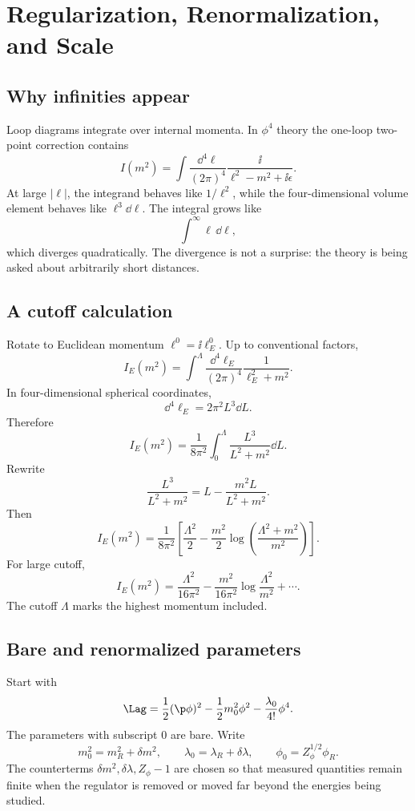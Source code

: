 \chapter{Regularization, Renormalization, and Scale}

\section{Why infinities appear}

Loop diagrams integrate over internal momenta.  In \(\phi^4\) theory the one-loop two-point correction contains
\[
  I(m^2)=\int\frac{\dd^4\ell}{(2\pi)^4}
  \frac{\ii}{\ell^2-m^2+\ii\epsilon}.
\]
At large \(|\ell|\), the integrand behaves like \(1/\ell^2\), while the four-dimensional volume element behaves like \(\ell^3\dd\ell\).  The integral grows like
\[
  \int^\infty \ell\,\dd\ell,
\]
which diverges quadratically.  The divergence is not a surprise: the theory is being asked about arbitrarily short distances.

\section{A cutoff calculation}

Rotate to Euclidean momentum \(\ell^0=\ii\ell_E^0\).  Up to conventional factors,
\[
  I_E(m^2)=\int^{\Lambda}\frac{\dd^4\ell_E}{(2\pi)^4}
  \frac{1}{\ell_E^2+m^2}.
\]
In four-dimensional spherical coordinates,
\[
  \dd^4\ell_E=2\pi^2 L^3\dd L.
\]
Therefore
\[
  I_E(m^2)
  =
  \frac{1}{8\pi^2}
  \int_0^\Lambda\frac{L^3}{L^2+m^2}\dd L.
\]
Rewrite
\[
  \frac{L^3}{L^2+m^2}=L-\frac{m^2L}{L^2+m^2}.
\]
Then
\[
  I_E(m^2)
  =
  \frac{1}{8\pi^2}
  \left[
  \frac{\Lambda^2}{2}
  -
  \frac{m^2}{2}\log\left(\frac{\Lambda^2+m^2}{m^2}\right)
  \right].
\]
For large cutoff,
\[
  I_E(m^2)
  =
  \frac{\Lambda^2}{16\pi^2}
  -
  \frac{m^2}{16\pi^2}\log\frac{\Lambda^2}{m^2}
  +\cdots .
\]
The cutoff \(\Lambda\) marks the highest momentum included.

\section{Bare and renormalized parameters}

Start with
\[
  \Lag=
  \frac12(\p\phi)^2
  -\frac12m_0^2\phi^2
  -\frac{\lambda_0}{4!}\phi^4.
\]
The parameters with subscript \(0\) are bare.  Write
\[
  m_0^2=m_R^2+\delta m^2,
  \qquad
  \lambda_0=\lambda_R+\delta\lambda,
  \qquad
  \phi_0=Z_\phi^{1/2}\phi_R.
\]
The counterterms \(\delta m^2,\delta\lambda,Z_\phi-1\) are chosen so that measured quantities remain finite when the regulator is removed or moved far beyond the energies being studied.

